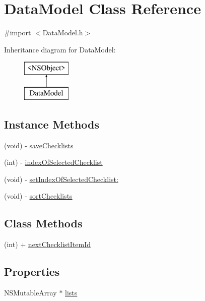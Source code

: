 \hypertarget{interface_data_model}{\section{Data\-Model Class Reference}
\label{interface_data_model}
}


{\ttfamily \#import $<$Data\-Model.\-h$>$}

Inheritance diagram for Data\-Model\-:\begin{figure}[H]
\begin{center}
\leavevmode
\includegraphics[height=2.000000cm]{interface_data_model}
\end{center}
\end{figure}
\subsection*{Instance Methods}
\begin{DoxyCompactItemize}
\item 
(void) -\/ \hyperlink{interface_data_model_a26940bdd21fd30c88f953f8e38a42e17}{save\-Checklists}
\item 
(int) -\/ \hyperlink{interface_data_model_a1445104b954e3f5b25bbd124edaf7e4d}{index\-Of\-Selected\-Checklist}
\item 
(void) -\/ \hyperlink{interface_data_model_aeaa1bd6e3239f77a83053bee4d73e168}{set\-Index\-Of\-Selected\-Checklist\-:}
\item 
(void) -\/ \hyperlink{interface_data_model_a31b8bbef5e707bfeed60557861555f5c}{sort\-Checklists}
\end{DoxyCompactItemize}
\subsection*{Class Methods}
\begin{DoxyCompactItemize}
\item 
(int) + \hyperlink{interface_data_model_a8a095d9b7b281f6598932b4961f8ee4c}{next\-Checklist\-Item\-Id}
\end{DoxyCompactItemize}
\subsection*{Properties}
\begin{DoxyCompactItemize}
\item 
N\-S\-Mutable\-Array $\ast$ \hyperlink{interface_data_model_af332000b9422580108ff08b6edbbeb50}{lists}
\end{DoxyCompactItemize}


